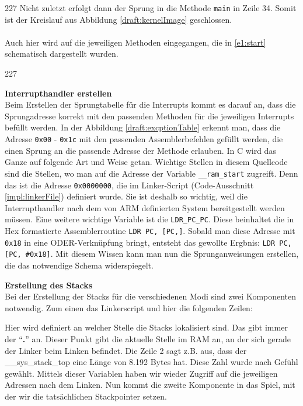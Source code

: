 \begin{dinglist}{227}
Nicht zuletzt erfolgt dann der Sprung in die Methode \texttt{main} in Zeile 34. Somit ist der Kreislauf aus Abbildung \ref{draft:kernelImage} geschlossen.\\ \\
Auch hier wird auf die jeweiligen Methoden eingegangen, die in 
\ref{e1:start} schematisch dargestellt wurden.
\begin{dinglist}{227}
	\item{\textbf{Interrupthandler erstellen}}\\
	Beim Erstellen der Sprungtabelle f\"ur die Interrupts kommt es darauf an, dass die Sprungadresse korrekt mit den passenden Methoden f\"ur die jeweiligen Interrupts bef\"ullt werden. In der Abbildung \ref{draft:excptionTable} erkennt man, dass die Adresse \texttt{0x00} - \texttt{0x1c} mit den passenden Assemblerbefehlen gef\"ullt werden, die einen Sprung an die passende Adresse der Methode erlauben. In C wird das Ganze auf folgende Art und Weise getan.	
Wichtige Stellen in diesem Quellcode sind die Stellen, wo man auf die Adresse der Variable \texttt{\_\_ram\_start} zugreift. Denn das ist die Adresse \texttt{0x0000000}, die im Linker-Script (Code-Ausschnitt \ref{impl:linkerFile}) definiert wurde. Sie ist deshalb so wichtig, weil die Interrupthandler nach dem von ARM definierten System bereitgestellt werden m\"ussen. Eine weitere wichtige Variable ist die \texttt{LDR\_PC\_PC}. Diese beinhaltet die in Hex formatierte Assemblerroutine \texttt{LDR PC, [PC,]}. Sobald man diese Adresse mit \texttt{0x18} in eine ODER-Verkn\"upfung bringt, entsteht das gewollte Ergbnis: \texttt{LDR PC, [PC, \#0x18]}.
Mit diesem Wissen kann man nun die Sprunganweisungen erstellen, die das notwendige Schema widerspiegelt.

	\item{\textbf{Erstellung des Stacks}}\\
	Bei der Erstellung der Stacks f\"ur die verschiedenen Modi sind zwei Komponenten notwendig. Zum einen das Linkerscript und hier die folgenden Zeilen:
	
	Hier wird definiert an welcher Stelle die Stacks lokalisiert sind. Das gibt immer der ``\textbf{.}'' an. Dieser Punkt gibt die aktuelle Stelle im RAM an, an der sich gerade der Linker beim Linken befindet. Die Zeile 2 sagt z.B. aus, dass der \_\_sys\_stack\_top eine L\"ange von 8.192 Bytes hat. Diese Zahl wurde nach Gef\"uhl gew\"ahlt. Mittels dieser Variablen haben wir wieder Zugriff auf die jeweiligen Adressen nach dem Linken. Nun kommt die zweite Komponente in das Spiel, mit der wir die tats\"achlichen Stackpointer setzen.	

\end{dinglist}
\end{dinglist}
